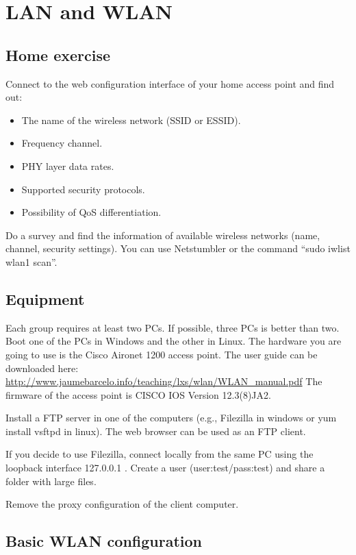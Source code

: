 \chapter{LAN and WLAN}

\section{Home exercise}

Connect to the web configuration interface of your home access point and find out:
\begin{itemize}
\item The name of the wireless network (SSID or ESSID).
\item Frequency channel.
\item PHY layer data rates.
\item Supported security protocols.
\item Possibility of QoS differentiation.
\end{itemize}

Do a survey and find the information of available wireless networks (name, channel, security settings).
You can use Netstumbler or the command ``sudo iwlist wlan1 scan''.

\section{Equipment}

Each group requires at least two PCs.
If possible, three PCs is better than two.
Boot one of the PCs in Windows and the other in Linux.
The hardware you are going to use is the Cisco Aironet 1200 access point.
The user guide can be downloaded here: \url{http://www.jaumebarcelo.info/teaching/lxs/wlan/WLAN_manual.pdf}
The firmware of the access point is CISCO IOS Version 12.3(8)JA2.

Install a FTP server in one of the computers (e.g., Filezilla in windows or yum install vsftpd in linux).
The web browser can be used as an FTP client.

If you decide to use Filezilla, connect locally from the same PC using the loopback interface 127.0.0.1 .
Create a user (user:test/pass:test) and share a folder with large files.

Remove the proxy configuration of the client computer.

\section{Basic WLAN configuration}

